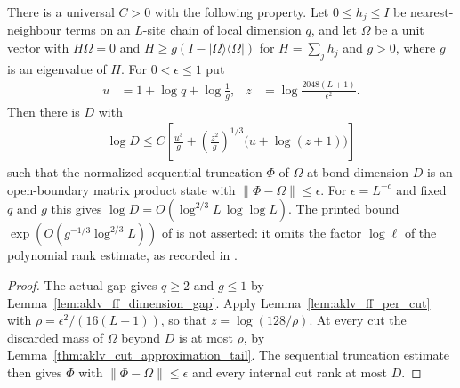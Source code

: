 \begin{theorem}
    \label{thm:aklv_frustration_free_mps}
    \leanok
    There is a universal $C>0$ with the following property. Let $0\le h_j\le I$
    be nearest-neighbour terms on an $L$-site chain of local dimension $q$,
    and let $\Omega$ be a unit vector with $H\Omega=0$ and
    $H\ge g(I-|\Omega\rangle\langle\Omega|)$ for $H=\sum_jh_j$ and $g>0$, where
    $g$ is an eigenvalue of $H$. For $0<\epsilon\le1$ put
    \begin{align*}
        u & =1+\log q+\log\frac1g,             &
        z & =\log\frac{2048(L+1)}{\epsilon^2}.
    \end{align*}
    Then there is $D$ with
    \begin{align*}
        \log D\le C\left[\frac{u^3}{g}+\left(\frac{z^2}{g}\right)^{1/3}
            \bigl(u+\log(z+1)\bigr)\right]
    \end{align*}
    such that the normalized sequential truncation $\Phi$ of $\Omega$ at bond
    dimension $D$ is an open-boundary matrix product state with
    $\|\Phi-\Omega\|\le\epsilon$. For $\epsilon=L^{-c}$ and fixed $q$ and $g$
    this gives $\log D=O(\log^{2/3}L\,\log\log L)$. The printed bound
    $\exp(O(g^{-1/3}\log^{2/3}L))$ of \cite[Section~5]{Arad2013AreaLaw} is
    not asserted: it omits the factor $\log\ell$ of the polynomial rank
    estimate, as recorded in \cite{gap:aklv13_frustration_free_mps_rate}.
\end{theorem}
\begin{proof}
    \leanok
    The actual gap gives $q\ge2$ and $g\le1$ by
    Lemma~\ref{lem:aklv_ff_dimension_gap}. Apply
    Lemma~\ref{lem:aklv_ff_per_cut} with $\rho=\epsilon^2/(16(L+1))$, so that
    $z=\log(128/\rho)$. At every cut the discarded mass of $\Omega$ beyond
    $D$ is at most $\rho$, by Lemma~\ref{thm:aklv_cut_approximation_tail}.
    The sequential truncation estimate then gives $\Phi$ with
    $\|\Phi-\Omega\|\le\epsilon$ and every internal cut rank at most $D$.
\end{proof}
